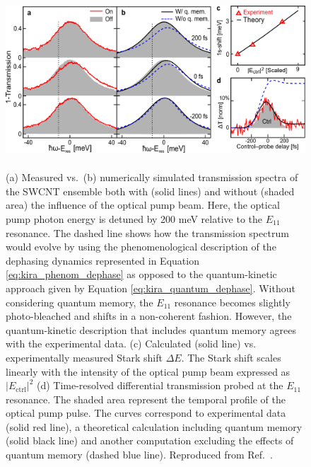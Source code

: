 \begin{figure}[ht]
	\centering
	\includegraphics[height=2.6in]{images/chapter_coherent/nonresonant}
	\caption{(a) Measured vs.\ (b) numerically simulated transmission spectra of the SWCNT ensemble both with (solid lines) and without (shaded area) the influence of the optical pump beam. Here, the optical pump photon energy is detuned by 200 meV relative to the $E_{11}$ resonance. The dashed line shows how the transmission spectrum would evolve by using the phenomenological description of the dephasing dynamics represented in Equation \eqref{eq:kira_phenom_dephase} as opposed to the quantum-kinetic approach given by Equation \eqref{eq:kira_quantum_dephase}. Without considering quantum memory, the $E_{11}$ resonance becomes slightly photo-bleached and shifts in a non-coherent fashion. However, the quantum-kinetic description that includes quantum memory agrees with the experimental data. (c) Calculated (solid line) vs. experimentally measured Stark shift $\Delta E$. The Stark shift scales linearly with the intensity of the optical pump beam expressed as $|E_\text{ctrl}|^2$ (d) Time-resolved differential transmission probed at the $E_{11}$resonance. The shaded area represent the temporal profile of the optical pump pulse. The curves correspond to experimental data (solid red line), a theoretical calculation including quantum memory (solid black line) and another computation excluding the effects of quantum memory (dashed blue line). Reproduced from Ref.\ \cite{mack2019}.}

  \label{fig:ose_kira_nonresonant}
\end{figure}


